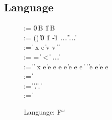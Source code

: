 \subsection{\Implang{} Language}
\label{sec:host-lang}
\begin{figure}[tp]
\small
\begin{bnf}
       \::= \cdot \| 0\,B \| 1\,B \\ 
    \::=
      () \| \itrue \| \ifalse \| 0 \| 1 \| -1 \| \dots \nlalt
      \ierr \| \data \| \off \| \iok \| \iecerr \| \iecpc \| \ldots \\

    \::= 
      \const \| %
       {\nrm x} e \| \ipair v v \nlalt
       \|  \|
       \\

    \::= 
      = \; \| \; < \; \| \inotop %
      \| \ldots \\

    \::= 
      \const \| \var \|  \|
       {\nrm x} e \| 
      \iapp e e \nlalt
       e \; e \|
      \iif e \; \ithen e \; \ielse e \nlalt
       \|  \|
       \|  \nlalt
       \nlalt
       \| \iappend e e \| \isub e {\nrm e}
      \\
      
    \::= 
      \iunitty \| \iboolty \| \iintty  \| 
      \invty \nlalt  \ibitsty \| \ioffty \| \iecty
  \\
   \meta{\ity} \::= 
      \ibasety \| \ityvar \| \iarrow \ity \ity \| \iprod \ity \ity \|
      \isum \ity \ity \nlalt
      \iseq \ity \| \forall \ityvar{:}\kappa.\ity  \|
      \imu \ityvar \ity   
      \| \lambda \alpha{:}\kappa.\ity 
      \| \ity \; \ity
  \\
   \meta{\kappa} \::= \kty \| \kappa \rightarrow \kappa
  
\end{bnf}
\caption{\Implang{} Language: F$^\omega$}
\label{fig:implang-syntax}
\end{figure}

